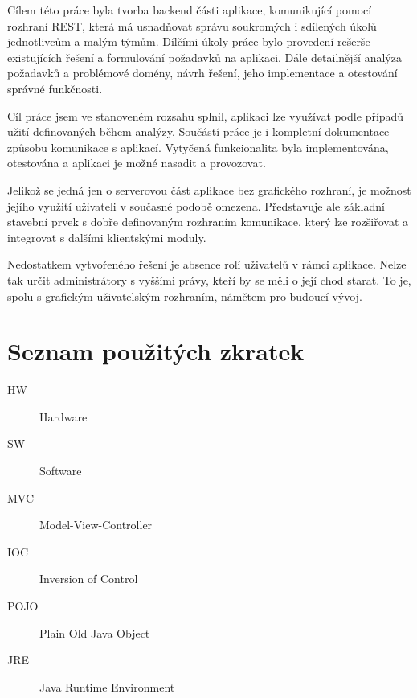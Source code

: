 \documentclass[thesis=B,czech]{FITthesis}[2012/06/26]
\begin{document}
\begin{conclusion}
	Cílem této práce byla tvorba backend části aplikace, komunikující pomocí rozhraní REST, která má usnadňovat správu soukromých i sdílených úkolů jednotlivcům a malým týmům. Dílčími úkoly práce bylo provedení rešerše existujících řešení a formulování požadavků na aplikaci. Dále detailnější analýza požadavků a problémové domény, návrh řešení, jeho implementace a otestování správné funkčnosti.
	
	Cíl práce jsem ve stanoveném rozsahu splnil, aplikaci lze využívat podle případů užití definovaných během analýzy. Součástí práce je i kompletní dokumentace způsobu komunikace s aplikací. Vytyčená funkcionalita byla implementována, otestována a aplikaci je možné nasadit a provozovat.
	
	Jelikož se jedná jen o serverovou část aplikace bez grafického rozhraní, je možnost jejího využití uživateli v současné podobě omezena. Představuje ale základní stavební prvek s dobře definovaným rozhraním komunikace, který lze rozšiřovat a integrovat s dalšími klientskými moduly.
	
	Nedostatkem vytvořeného řešení je absence rolí uživatelů v rámci aplikace. Nelze tak určit administrátory s vyššími právy, kteří by se měli o její chod starat. To je, spolu s grafickým uživatelským rozhraním, námětem pro budoucí vývoj.
	
	
	 
	 
\end{conclusion}

















\appendix

\chapter{Seznam použitých zkratek}
\begin{description}
	\item[HW] Hardware
	\item[SW] Software
	\item[MVC] Model-View-Controller
	\item[IOC] Inversion of Control
	\item[POJO] Plain Old Java Object
	\item[JRE] Java Runtime Environment
\end{description}
\end{document}
